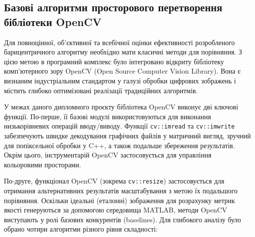 \subsection{Базові алгоритми просторового перетворення бібліотеки OpenCV}

Для повноцінної, об'єктивної та всебічної оцінки ефективності розробленого барицентричного алгоритму необхідно мати класичні методи для порівняння. З цією метою в програмний комплекс було інтегровано відкриту бібліотеку комп'ютерного зору OpenCV (Open Source Computer Vision Library). Вона є визнаним індустріальним стандартом у галузі обробки цифрових зображень і містить глибоко оптимізовані реалізації традиційних алгоритмів.

У межах даного дипломного проєкту бібліотека OpenCV виконує дві ключові функції. По-перше, її базові модулі використовуються для виконання низькорівневих операцій вводу/виводу. Функції \texttt{cv::imread} та \texttt{cv::imwrite} забезпечують швидке декодування графічних файлів у матричний вигляд, зручний для попіксельної обробки у C++, а також подальше збереження результатів. Окрім цього, інструментарій OpenCV застосовується для управління кольоровими просторами.

По-друге, функціонал OpenCV (зокрема \texttt{cv::resize}) застосовується для отримання альтернативних результатів масштабування з метою їх подальшого порівняння. Оскільки ідеальні (еталонні) зображення для розрахунку метрик якості генеруються за допомогою середовища MATLAB, методи OpenCV виступають у ролі базових конкурентів (baselines). Для глибокого аналізу було обрано чотири алгоритми різного рівня складності:


